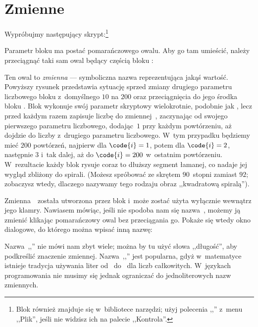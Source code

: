 \documentclass[a4paper]{report}
\begin{document}
\section{Zmienne}

Wypróbujmy następujący skrypt:\footnote{Blok \footnotemark{} również znajduje się w~bibliotece narzędzi; użyj polecenia ,,'' z~menu ,,Plik'', jeśli nie widzisz ich na palecie ,,Kontrola''.}\nopagebreak


Parametr bloku  ma postać pomarańczowego owalu. Aby go tam umieścić, należy przeciągnąć taki sam owal będący częścią bloku :\nopagebreak


Ten owal to \emph{zmienna} --- symboliczna nazwa reprezentująca jakąś wartość. Powyższy rysunek przedstawia sytuację sprzed zmiany drugiego parametru liczbowego bloku  z~domyślnego $10$ na $200$ oraz przeciągnięcia do jego środka bloku . Blok  wykonuje swój parametr skryptowy wielokrotnie, podobnie jak , lecz przed każdym razem zapisuje liczbę do zmiennej~, zaczynając od swojego pierwszego parametru liczbowego, dodając~$1$ przy każdym powtórzeniu, aż dojdzie do liczby z~drugiego parametru liczbowego. W~tym przypadku będziemy mieć $200$ powtórzeń, najpierw dla $\code{i}=1$, potem dla $\code{i}=2$, następnie $3$ i~tak dalej, aż do $\code{i}=200$ w~ostatnim powtórzeniu. W~rezultacie każdy blok  rysuje coraz to dłuższy segment łamanej, co nadaje jej wygląd zbliżony do spirali. (Możesz spróbować ze skrętem $90$~stopni zamiast $92$; zobaczysz wtedy, dlaczego nazywamy tego rodzaju obraz ,,kwadratową spiralą'').

Zmienna~~została utworzona przez blok  i~może zostać użyta wyłącznie wewnątrz jego klamry. Nawiasem mówiąc, jeśli nie spodoba nam się nazwa~, możemy ją zmienić klikając pomarańczowy owal bez przeciągania go. Pokaże się wtedy okno dialogowe, do którego można wpisać inną nazwę:\nopagebreak


Nazwa~,,'' nie mówi nam zbyt wiele; można by tu użyć słowa ,,długość'', aby podkreślić znaczenie zmiennej. Nazwa~,,'' jest popularna, gdyż w~matematyce istnieje tradycja używania liter od~ do~ dla liczb całkowitych. W~językach programowania nie musimy się jednak ograniczać do jednoliterowych nazw zmiennych.
\end{document}
